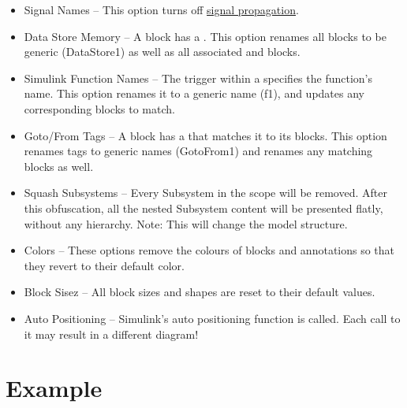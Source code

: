 \documentclass{article}
\begin{document}
\begin{itemize}
	\item Signal Names – This option turns off \href{https://www.mathworks.com/help/simulink/ug/signal-label-propagation.html}{signal propagation}.

	\item Data Store Memory -- A \DSM block has a . This option renames all  \DSM blocks to be generic (\eg DataStore1) as well as all associated \DSR and \DSW blocks.

	\item Simulink Function Names -- The trigger within a \simfunc specifies the function's name. This option renames it to a generic name (\eg f1), and updates any corresponding \simfunccaller blocks to match.
	
	\item Goto/From Tags -- A \goto block has a  that matches it to its \from blocks. This option renames tags to generic names (\eg GotoFrom1) and renames any matching \from blocks as well.
	
	\item Squash Subsystems -- Every Subsystem in the scope will be removed. After this obfuscation, all the nested Subsystem content will be presented flatly, without any hierarchy. Note: This will change the model structure.
	
	\item Colors -- These options remove the colours of blocks and annotations so that they revert to their default color.

	\item Block Sisez -- All block sizes and shapes are reset to their default values.

	\item Auto Positioning -- Simulink's auto positioning function is called. Each call to it may result in a different diagram!
\end{itemize}



\section{Example}
\end{document}
